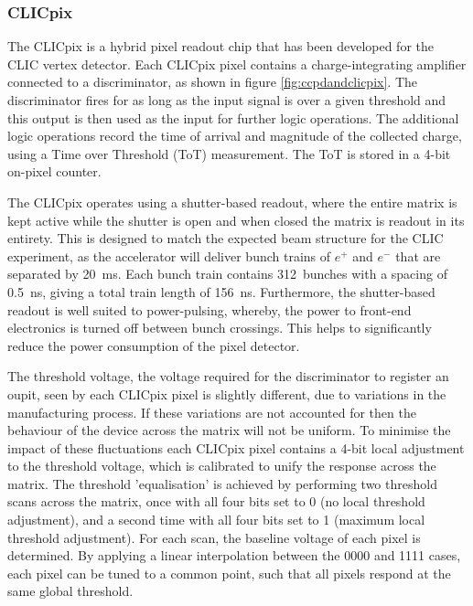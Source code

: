
\subsubsection{CLICpix}

The CLICpix is a hybrid pixel readout chip that has been developed for the CLIC vertex detector.  Each CLICpix pixel contains a charge-integrating amplifier connected to a discriminator, as shown in figure \ref{fig:ccpdandclicpix}.  The discriminator fires for as long as the input signal is over a given threshold and this output is then used as the input for further logic operations.  The additional logic operations record the time of arrival and magnitude of the collected charge, using a Time over Threshold (ToT) measurement.  The ToT is stored in a 4-bit on-pixel counter.  

The CLICpix operates using a shutter-based readout, where the entire matrix is kept active while the shutter is open and when closed the matrix is readout in its entirety.  This is designed to match the expected beam structure for the CLIC experiment, as the accelerator will deliver bunch trains of $e^{+}$ and $e^{-}$ that are separated by 20~ms.  Each bunch train contains 312~bunches with a spacing of 0.5~ns, giving a total train length of 156~ns.  Furthermore, the shutter-based readout is well suited to power-pulsing, whereby, the power to front-end electronics is turned off between bunch crossings.  This helps to significantly reduce the power consumption of the pixel detector.

The threshold voltage, the voltage required for the discriminator to register an oupit, seen by each CLICpix pixel is slightly different, due to variations in the manufacturing process.  If these variations are not accounted for then the behaviour of the device across the matrix will not be uniform.  To minimise the impact of these fluctuations each CLICpix pixel contains a 4-bit local adjustment to the threshold voltage, which is calibrated to unify the response across the matrix.  The threshold 'equalisation' is achieved by performing two threshold scans across the matrix, once with all four bits set to 0 (no local threshold adjustment), and a second time with all four bits set to 1 (maximum local threshold adjustment).  For each scan, the baseline voltage of each pixel is determined. By applying a linear interpolation between the 0000 and 1111 cases, each pixel can be tuned to a common point, such that all pixels respond at the same global threshold.

